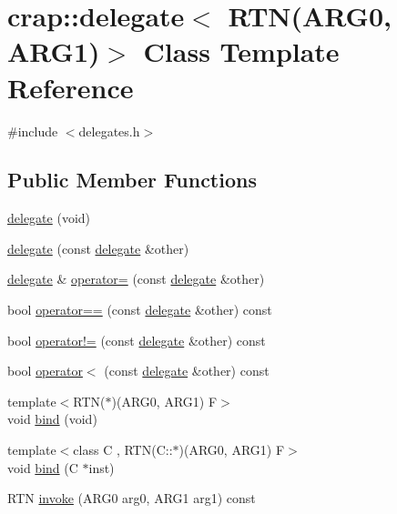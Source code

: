 \hypertarget{classcrap_1_1delegate_3_01_r_t_n_07_a_r_g0_00_01_a_r_g1_08_4}{}\section{crap\+:\+:delegate$<$ R\+T\+N(A\+R\+G0, A\+R\+G1)$>$ Class Template Reference}
\label{classcrap_1_1delegate_3_01_r_t_n_07_a_r_g0_00_01_a_r_g1_08_4}


{\ttfamily \#include $<$delegates.\+h$>$}

\subsection*{Public Member Functions}
\begin{DoxyCompactItemize}
\item 
\hyperlink{classcrap_1_1delegate_3_01_r_t_n_07_a_r_g0_00_01_a_r_g1_08_4_a74ae17eddf35bbbbe08b8f38b1266cff}{delegate} (void)
\item 
\hyperlink{classcrap_1_1delegate_3_01_r_t_n_07_a_r_g0_00_01_a_r_g1_08_4_a4b290d44f2a2af6400e0e2db9c30a847}{delegate} (const \hyperlink{classcrap_1_1delegate}{delegate} \&other)
\item 
\hyperlink{classcrap_1_1delegate}{delegate} \& \hyperlink{classcrap_1_1delegate_3_01_r_t_n_07_a_r_g0_00_01_a_r_g1_08_4_a968ddc9550af603014982896c7a955f4}{operator=} (const \hyperlink{classcrap_1_1delegate}{delegate} \&other)
\item 
bool \hyperlink{classcrap_1_1delegate_3_01_r_t_n_07_a_r_g0_00_01_a_r_g1_08_4_aaa5dcf468a13c5be1352acc66dad8b37}{operator==} (const \hyperlink{classcrap_1_1delegate}{delegate} \&other) const 
\item 
bool \hyperlink{classcrap_1_1delegate_3_01_r_t_n_07_a_r_g0_00_01_a_r_g1_08_4_a54b916efaa4f637273436b942e89c026}{operator!=} (const \hyperlink{classcrap_1_1delegate}{delegate} \&other) const 
\item 
bool \hyperlink{classcrap_1_1delegate_3_01_r_t_n_07_a_r_g0_00_01_a_r_g1_08_4_adddd185fe95d7fbad9ea7296a13d8ac3}{operator$<$} (const \hyperlink{classcrap_1_1delegate}{delegate} \&other) const 
\item 
{\footnotesize template$<$R\+T\+N($\ast$)(\+A\+R\+G0, A\+R\+G1) F$>$ }\\void \hyperlink{classcrap_1_1delegate_3_01_r_t_n_07_a_r_g0_00_01_a_r_g1_08_4_a30027186bf644d23de09e3860d150a06}{bind} (void)
\item 
{\footnotesize template$<$class C , R\+T\+N(\+C\+::$\ast$)(\+A\+R\+G0, A\+R\+G1) F$>$ }\\void \hyperlink{classcrap_1_1delegate_3_01_r_t_n_07_a_r_g0_00_01_a_r_g1_08_4_a49ac84fc81f9795dbdb1aac46d715f8d}{bind} (C $\ast$inst)
\item 
R\+T\+N \hyperlink{classcrap_1_1delegate_3_01_r_t_n_07_a_r_g0_00_01_a_r_g1_08_4_a8ea8a0a5e0f164910a3e7ae57ef0a553}{invoke} (A\+R\+G0 arg0, A\+R\+G1 arg1) const 
\end{DoxyCompactItemize}


